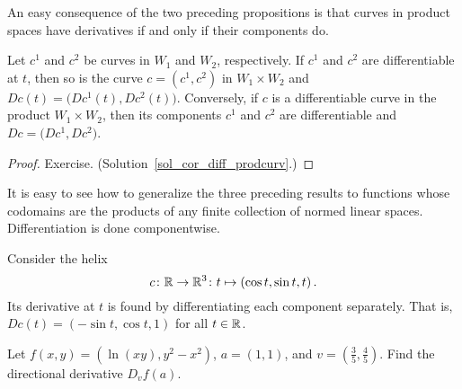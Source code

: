 An easy consequence of the two preceding propositions is that curves in product spaces have
derivatives if and only if their components do.

\begin{cor}\label{cor_diff_prodcurv}  Let $c^1$ and $c^2$ be curves in $W_1$ and $W_2$,
respectively.  If $c^1$ and $c^2$ are differentiable at $t$, then so is the curve $c =
(c^1,c^2)$ in $W_1 \times W_2$ and $Dc(t) = \bigl(Dc^1(t), Dc^2(t)\bigr)$. Conversely, if $c$
is a differentiable curve in the product $W_1 \times W_2$, then its components $c^1$ and $c^2$
are differentiable and $Dc = \bigl(Dc^1,Dc^2\bigr)$.
\end{cor}

\begin{proof} Exercise.  (Solution~\ref{sol_cor_diff_prodcurv}.)  \ns  \end{proof}

It is easy to see how to generalize the three preceding results to functions whose codomains
are the products of any finite collection of normed linear spaces.  Differentiation is done
componentwise.

\begin{exam}  Consider the helix
  \[ c \colon \mathbb{R} \rightarrow \mathbb{R}^3 \colon t \mapsto (\cos t,\sin t,t)\,. \]
Its derivative at $t$ is found by differentiating each component separately. That is, $Dc(t) =
(-\sin t,\cos t,1)$ for all $t \in \mathbb{R}$.
\end{exam}

\begin{prob}  Let $f(x,y) = (\ln(xy), y^2 - x^2)$, $a = (1,1)$, and $v = (\frac35,\frac45)$.
Find the directional derivative $D_vf(a)$.
\end{prob}
